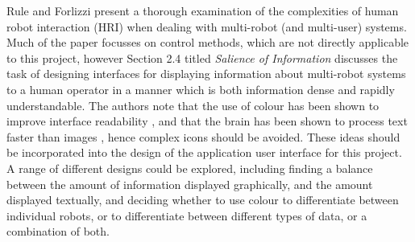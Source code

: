 \documentclass[hidelinks,10pt]{article}
\begin{document}
Rule and Forlizzi \cite{DesginingInterfaces} present a thorough examination of the complexities of human robot interaction (HRI) when dealing with multi-robot (and multi-user) systems. Much of the paper focusses on control methods, which are not directly applicable to this project, however Section 2.4 titled \textit{Salience of Information} discusses the task of designing interfaces for displaying information about multi-robot systems to a human operator in a manner which is both information dense and rapidly understandable. The authors note that the use of colour has been shown to improve interface readability \cite{InterfaceColour}, and that the brain has been shown to process text faster than images \cite{InterfaceText}, hence complex icons should be avoided. These ideas should be incorporated into the design of the application user interface for this project. A range of different designs could be explored, including finding a balance between the amount of information displayed graphically, and the amount displayed textually, and deciding whether to use colour to differentiate between individual robots, or to differentiate between different types of data, or a combination of both.
\end{document}
